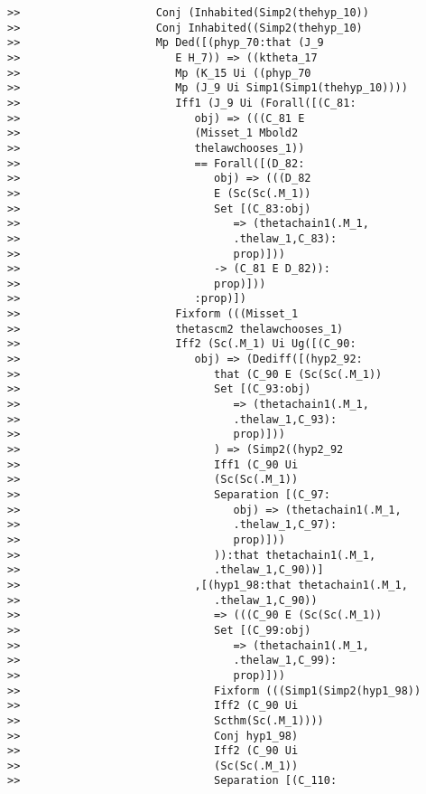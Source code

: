 \documentclass[12pt]{article}
\begin{document}
\begin{verbatim}
>>                     Conj (Inhabited(Simp2(thehyp_10))
>>                     Conj Inhabited((Simp2(thehyp_10)
>>                     Mp Ded([(phyp_70:that (J_9
>>                        E H_7)) => ((ktheta_17
>>                        Mp (K_15 Ui ((phyp_70
>>                        Mp (J_9 Ui Simp1(Simp1(thehyp_10))))
>>                        Iff1 (J_9 Ui (Forall([(C_81:
>>                           obj) => (((C_81 E
>>                           (Misset_1 Mbold2
>>                           thelawchooses_1))
>>                           == Forall([(D_82:
>>                              obj) => (((D_82
>>                              E (Sc(Sc(.M_1))
>>                              Set [(C_83:obj)
>>                                 => (thetachain1(.M_1,
>>                                 .thelaw_1,C_83):
>>                                 prop)]))
>>                              -> (C_81 E D_82)):
>>                              prop)]))
>>                           :prop)])
>>                        Fixform (((Misset_1
>>                        thetascm2 thelawchooses_1)
>>                        Iff2 (Sc(.M_1) Ui Ug([(C_90:
>>                           obj) => (Dediff([(hyp2_92:
>>                              that (C_90 E (Sc(Sc(.M_1))
>>                              Set [(C_93:obj)
>>                                 => (thetachain1(.M_1,
>>                                 .thelaw_1,C_93):
>>                                 prop)]))
>>                              ) => (Simp2((hyp2_92
>>                              Iff1 (C_90 Ui
>>                              (Sc(Sc(.M_1))
>>                              Separation [(C_97:
>>                                 obj) => (thetachain1(.M_1,
>>                                 .thelaw_1,C_97):
>>                                 prop)]))
>>                              )):that thetachain1(.M_1,
>>                              .thelaw_1,C_90))]
>>                           ,[(hyp1_98:that thetachain1(.M_1,
>>                              .thelaw_1,C_90))
>>                              => (((C_90 E (Sc(Sc(.M_1))
>>                              Set [(C_99:obj)
>>                                 => (thetachain1(.M_1,
>>                                 .thelaw_1,C_99):
>>                                 prop)]))
>>                              Fixform (((Simp1(Simp2(hyp1_98))
>>                              Iff2 (C_90 Ui
>>                              Scthm(Sc(.M_1))))
>>                              Conj hyp1_98)
>>                              Iff2 (C_90 Ui
>>                              (Sc(Sc(.M_1))
>>                              Separation [(C_110:

\end{verbatim}
\end{document}
